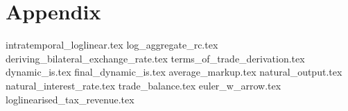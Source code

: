 \section{Appendix}
\appendix 
\renewcommand{\theequation}{A.\arabic{equation}}
{intratemporal_loglinear.tex}
{log_aggregate_rc.tex}
{deriving_bilateral_exchange_rate.tex}
{terms_of_trade_derivation.tex}
{dynamic_is.tex}
{final_dynamic_is.tex}
{average_markup.tex}
{natural_output.tex}
{natural_interest_rate.tex}
{trade_balance.tex}
{euler_w_arrow.tex}
{loglinearised_tax_revenue.tex}
